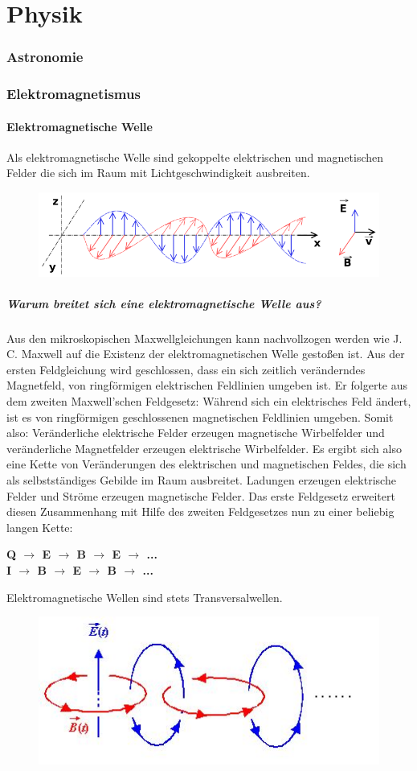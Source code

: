 \part{Physik}
\section{Astronomie}
\section{Elektromagnetismus}
	\subsection{Elektromagnetische Welle}
		Als elektromagnetische Welle sind gekoppelte elektrischen und magnetischen Felder die sich im Raum mit Lichtgeschwindigkeit ausbreiten.
		\begin{figure}[h]
			\centering
			\includegraphics[width=0.8\linewidth]{./pics/ph/wave}
		\end{figure}
		\subsubsection*{Warum breitet sich eine elektromagnetische Welle aus?}
			Aus den mikroskopischen Maxwellgleichungen kann nachvollzogen werden wie J. C. Maxwell auf die Existenz der elektromagnetischen Welle gestoßen ist. Aus der ersten Feldgleichung wird geschlossen, dass ein sich zeitlich veränderndes Magnetfeld, von ringförmigen elektrischen Feldlinien umgeben ist.
			Er folgerte aus dem zweiten Maxwell'schen Feldgesetz: Während sich ein elektrisches Feld ändert, ist es von ringförmigen geschlossenen magnetischen Feldlinien umgeben.
			Somit also: Veränderliche elektrische Felder erzeugen magnetische Wirbelfelder und veränderliche Magnetfelder erzeugen elektrische Wirbelfelder.
			Es ergibt sich also eine Kette von Veränderungen des elektrischen und magnetischen Feldes, die sich als selbstständiges Gebilde im Raum ausbreitet. Ladungen erzeugen elektrische Felder und Ströme erzeugen magnetische Felder.
			Das erste Feldgesetz erweitert diesen Zusammenhang mit Hilfe des zweiten Feldgesetzes nun zu einer beliebig langen Kette:
			\begin{center}
				\large \textbf{Q $ \rightarrow $ E $ \rightarrow $ B $ \rightarrow $ E $ \rightarrow $ ...\\
					\text{ }I  $ \rightarrow $ B $ \rightarrow $ E $ \rightarrow $ B $ \rightarrow $ ...}
			\end{center}
			Elektromagnetische Wellen sind stets Transversalwellen.
			\begin{figure}[h]
				\centering
				\includegraphics[width=0.3\linewidth]{./pics/ph/trans}
			\end{figure}
